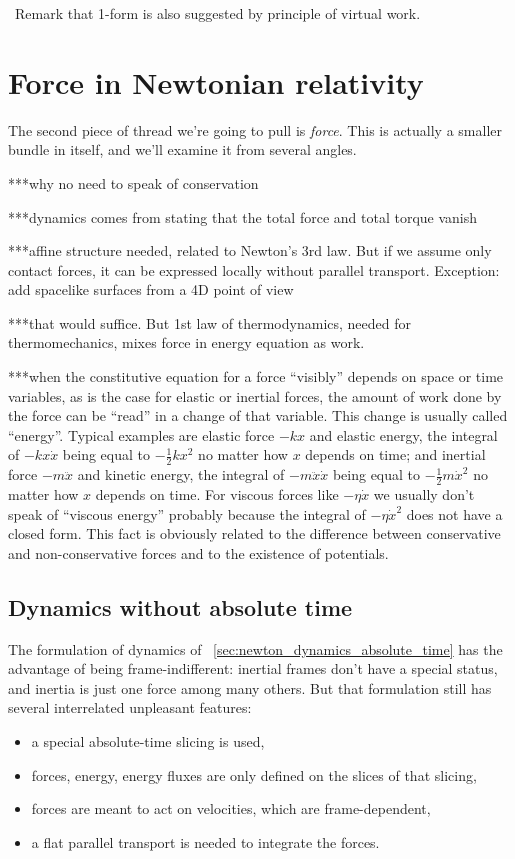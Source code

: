\documentclass[\ifafour a4paper,12pt,\else a5paper,10pt,\fi%
onecolumn,oneside,article,%
british%
]{memoir}
\theoremstyle{remark}
\theoremstyle{innote}
\renewcommand*{\|}[1][]{\nonscript\,#1\vert\nonscript\;\mathopen{}}
\newcommand*{\puzzle}{{\fontencoding{U}\fontfamily{fontawesometwo}\selectfont\symbol{225}}}
\newcommand*{\wrench}{{\fontencoding{U}\fontfamily{fontawesomethree}\selectfont\symbol{114}}}
\newcommand{\mynote}[1]{ {\color{notecolour}\wrench\ #1}}
\newcommand*{\psect}{{\footnotesize\puzzle}}%
\begin{document}
\mynote{Remark that 1-form is also suggested by principle of virtual work.}

\section{Force in Newtonian relativity}
\label{sec:force}




The second piece of thread we're going to pull is \emph{force}. This is
actually a smaller bundle in itself, and we'll examine it from several angles.

***why no need to speak of conservation

***dynamics comes from stating that the total force and total torque vanish

***affine structure needed, related to Newton's 3rd law. But if we assume
only contact forces, it can be expressed locally without parallel
transport. Exception: add spacelike surfaces from a 4D point of view

***that would suffice. But 1st law of thermodynamics, needed for
thermomechanics, mixes force in energy equation as work.


***when the constitutive equation for a force \enquote{visibly} depends on
space or time variables, as is the case for elastic or inertial forces, the
amount of work done by the force can be \enquote{read} in a change of that
variable. This change is usually called \enquote{energy}. Typical examples
are elastic force $-kx$ and elastic energy, the integral of $-kx\Dot{x}$
being equal to $-\frac{1}{2}kx^2$ no matter how $x$ depends on time; and
inertial force $-m\ddot{x}$ and kinetic energy, the integral of
$-m\ddot{x}\Dot{x}$ being equal to $-\frac{1}{2}m\Dot{x}^2$ no matter how
$x$ depends on time. For viscous forces like $-\eta\Dot{x}$ we usually
don't speak of \enquote{viscous energy} probably because the integral of
$-\eta\Dot{x}^2$ does not have a closed form. This fact is obviously
related to the difference between conservative and non-conservative forces
and to the existence of potentials.




\subsection{Dynamics without absolute time}
\label{sec:newton_dynamics_without_absolute_time}

The formulation of dynamics of
\psect~\ref{sec:newton_dynamics_absolute_time} has the advantage of being
frame-indifferent: inertial frames don't have a special status, and inertia
is just one force among many others. But that formulation still has several
interrelated unpleasant features:
\begin{itemize}
\item a special absolute-time slicing is used,
\item forces, energy, energy fluxes are only defined on the slices of that
  slicing,
\item forces are meant to act on velocities, which are frame-dependent,
\item a flat parallel transport is needed to integrate the forces.
\end{itemize}
\end{document}
